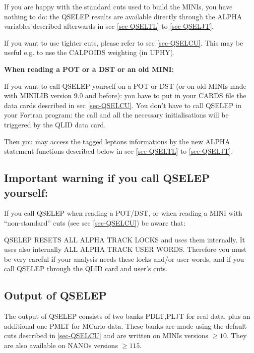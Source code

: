                   If you are happy with the standard cuts used to build the
         MINIs, you have nothing to do: the QSELEP results are available
         directly through the ALPHA variables described afterwards in sec
                             \ref{sec-QSELTL} to \ref{sec-QSELJT}.
 
                  If you want to use tighter cuts, please refer to sec \ref{sec-QSELCU}.
         This may be useful e.g. to use the CALPOIDS weighting (in UPHY).
 
{\bf When reading a POT or a DST or an old MINI:}
 
         If you want to call QSELEP yourself on a POT or DST (or on old MINIs
         made with MINILIB version 9.0 and before): you have to put in your
         CARDS file the  data cards described in sec \ref{sec-QSELCU}. You don't have to call
         QSELEP in your Fortran program: the call and all the necessary
         initialisations will be triggered by the QLID data card.
 
         Then you may access the tagged leptons informations by the new ALPHA
         statement functions described below in sec
                             \ref{sec-QSELTL} to \ref{sec-QSELJT}.
 
\par
\subsection{\label{sec-OAQSELW}Important warning if you call QSELEP yourself:}
 
\par
         If you call QSELEP when reading a POT/DST, or when reading a MINI
         with ``non-standard'' cuts (see sec \ref{sec-QSELCU})  be aware that:
 
         QSELEP RESETS ALL ALPHA TRACK LOCKS and uses them internally.
         It uses also internally ALL ALPHA TRACK USER WORDS. Therefore you
         must be very careful if your analysis needs these locks and/or user
         words, and if you call QSELEP through the QLID card and user's cuts.
 
 
\subsection{\label{sec-QSELOU}Output of QSELEP}
 
      The output of QSELEP consists of two banks PDLT,PLJT for real data, plus an additional
      one PMLT for MCarlo data. These banks are made using the default  cuts
      described in \ref{sec-QSELCU} and are written on MINIs versions $\geq 10$.
      They are also available on NANOs versions $\geq115$.
 
